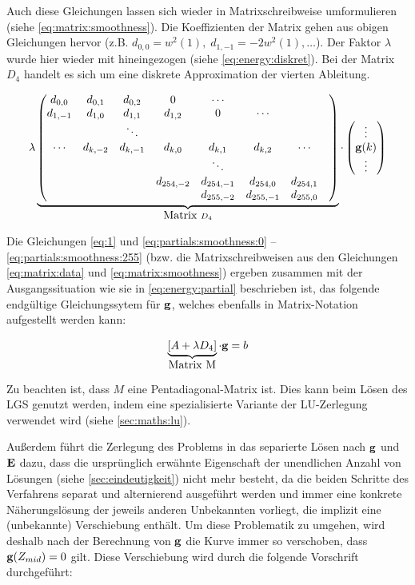 Auch diese Gleichungen lassen sich wieder in Matrixschreibweise umformulieren (siehe \autoref{eq:matrix:smoothness}). Die  Koeffizienten der Matrix gehen aus obigen Gleichungen hervor (z.B. $d_{0,0} = w^2(1), \; d_{1,-1} = -2w^2(1), \dots$). Der Faktor $\lambda$ wurde hier wieder mit hineingezogen (siehe \autoref{eq:energy:diskret}). Bei der Matrix $D_4$ handelt es sich um eine diskrete Approximation der vierten Ableitung.

\begin{align}
\label{eq:matrix:smoothness}
\lambda
\underbrace{
\begin{pmatrix}
d_{0,0} & d_{0,1} & d_{0,2} & 0 &\cdots\\
d_{1,-1} & d_{1,0} & d_{1,1} & d_{1,2} & 0 &\cdots\\
&  & \ddots &  \\
\cdots  & d_{k,-2} & d_{k,-1} & d_{k,0}&d_{k,1} &d_{k,2} & \cdots\\
&&&&\ddots&&&\\
&&&d_{254,-2}&d_{254,-1}&d_{254,0}&d_{254,1}\\
&&&&d_{255,-2}&d_{255,-1}&d_{255,0}\\
\end{pmatrix}}_{\mbox{Matrix } D_4}
\cdot
\begin{pmatrix}
\vdots\\
\mathbf g(k)\\
\vdots
\end{pmatrix}
\end{align}

Die Gleichungen \ref{eq:1} und \ref{eq:partials:smoothness:0} -- \ref{eq:partials:smoothness:255} (bzw. die Matrixschreibweisen aus den Gleichungen \ref{eq:matrix:data} und \ref{eq:matrix:smoothness}) ergeben zusammen mit der Ausgangssituation wie sie in \autoref{eq:energy:partial} beschrieben ist, das folgende endgültige Gleichungssytem für $\mathbf g$, welches ebenfalls in Matrix-Notation aufgestellt werden kann:
 
\begin{align}
\label{eq:g:lgs}
\underbrace{[A+\lambda D_4]}_{\mbox{Matrix M}}\cdot \mathbf g = b
\end{align}

Zu beachten ist, dass $M$ eine \gls{Pentadiagonal-Matrix} ist. Dies kann beim Lösen des \gls{LGS} genutzt werden, indem eine spezialisierte Variante der LU-Zerlegung verwendet wird (siehe \autoref{sec:maths:lu}).

Außerdem führt die Zerlegung des Problems in das separierte Lösen nach $\mathbf g$ und $\mathbf E$ dazu, dass die ursprünglich erwähnte Eigenschaft der unendlichen Anzahl von Lösungen (siehe \autoref{sec:eindeutigkeit}) nicht mehr besteht, da die beiden Schritte des Verfahrens separat und alternierend ausgeführt werden und immer eine konkrete Näherungslösung der jeweils anderen Unbekannten vorliegt, die implizit eine (unbekannte) Verschiebung enthält.
Um diese Problematik zu umgehen, wird deshalb nach der Berechnung von $\mathbf g$ die Kurve immer so verschoben, dass $\mathbf g(Z_{mid}) = 0$ gilt. Diese Verschiebung wird durch die folgende Vorschrift durchgeführt:

